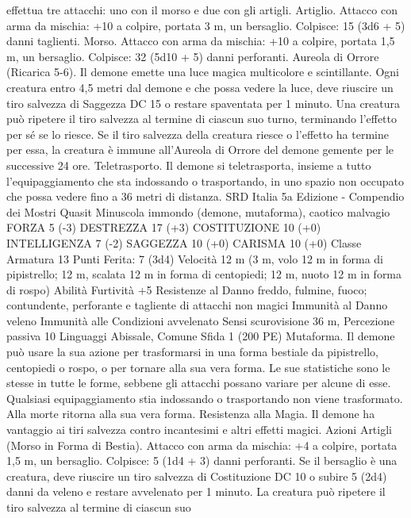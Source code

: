 \begin{multicols}{2}
effettua tre attacchi: uno con il morso e due con gli artigli.
Artiglio. Attacco con arma da mischia: +10 a colpire, portata 3
m, un bersaglio.
Colpisce: 15 (3d6 + 5) danni taglienti.
Morso. Attacco con arma da mischia: +10 a colpire, portata 1,5
m, un bersaglio.
Colpisce: 32 (5d10 + 5) danni perforanti.
Aureola di Orrore (Ricarica 5-6). Il demone emette una luce
magica multicolore e scintillante. Ogni creatura entro 4,5 metri
dal demone e che possa vedere la luce, deve riuscire un tiro
salvezza di Saggezza DC 15 o restare spaventata per 1 minuto.
Una creatura può ripetere il tiro salvezza al termine di ciascun
suo turno, terminando l’effetto per sé se lo riesce. Se il tiro
salvezza della creatura riesce o l’effetto ha termine per essa, la
creatura è immune all’Aureola di Orrore del demone gemente
per le successive 24 ore.
Teletrasporto. Il demone si teletrasporta, insieme a tutto
l’equipaggiamento che sta indossando o trasportando, in uno
spazio non occupato che possa vedere fino a 36 metri di distanza.
SRD Italia 5a Edizione - Compendio dei Mostri
Quasit
Minuscola immondo (demone, mutaforma), caotico malvagio
FORZA 5 (-3)
DESTREZZA 17 (+3)
COSTITUZIONE 10 (+0)
INTELLIGENZA 7 (-2)
SAGGEZZA 10 (+0)
CARISMA 10 (+0)
Classe Armatura 13
\hspace*{0pt}\hfill{Punti Ferita}: 7 (3d4)
Velocità 12 m (3 m, volo 12 m in forma di pipistrello; 12 m,
scalata 12 m in forma di centopiedi; 12 m, nuoto 12 m in forma
di rospo)
Abilità Furtività +5
Resistenze al Danno freddo, fulmine, fuoco; contundente,
perforante e tagliente di attacchi non magici
Immunità al Danno veleno
Immunità alle Condizioni avvelenato
Sensi scurovisione 36 m, Percezione passiva 10
Linguaggi Abissale, Comune
Sfida 1 (200 PE)
Mutaforma. Il demone può usare la sua azione per trasformarsi
in una forma bestiale da pipistrello, centopiedi o rospo, o per
tornare alla sua vera forma. Le sue statistiche sono le stesse in
tutte le forme, sebbene gli attacchi possano variare per alcune di
esse. Qualsiasi equipaggiamento stia indossando o trasportando
non viene trasformato. Alla morte ritorna alla sua vera forma.
Resistenza alla Magia. Il demone ha vantaggio ai tiri salvezza
contro incantesimi e altri effetti magici.
Azioni
Artigli (Morso in Forma di Bestia). Attacco con arma da
mischia: +4 a colpire, portata 1,5 m, un bersaglio.
Colpisce: 5 (1d4 + 3) danni perforanti. Se il bersaglio è una
creatura, deve riuscire un tiro salvezza di Costituzione DC 10 o
subire 5 (2d4) danni da veleno e restare avvelenato per 1 minuto.
La creatura può ripetere il tiro salvezza al termine di ciascun suo

\end{multicols}
